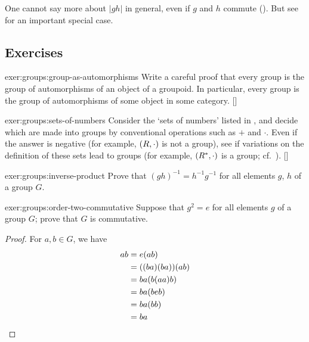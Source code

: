 One cannot say more about $|gh|$ in general, even if $g$ and $h$
commute (). But see
 for an important special
case.

\subsection*{Exercises}

\begin{exer}{\exerused}{exer:groups:group-as-automorphisms}
  Write a careful proof that every group is the group of automorphisms
  of an object of a groupoid. In particular, every group is the group of
  automorphisms of some object in some
  category. []
\end{exer}
\begin{exer}{\exerused}{exer:groups:sets-of-numbers}
  Consider the `sets of numbers' listed in
  , and decide which are
  made into groups by conventional operations such as $+$ and
  $\cdot$. Even if the answer is negative (for example, $(R, \cdot)$
  is not a group), see if variations on the definition of these sets
  lead to groups (for example, $(R^*, \cdot)$ is a group; cf.\
  ). []
\end{exer}
\begin{exer}{}{exer:groups:inverse-product}
  Prove that $(gh)^{-1} = h^{-1}g^{-1}$ for all elements $g$, $h$ of a
  group $G$.
\end{exer}
\begin{exer}{}{exer:groups:order-two-commutative}
  Suppose that $g^2 = e$ for all elements $g$ of a group $G$; prove
  that $G$ is commutative.
\end{exer}
\begin{proof}
  For $a,b \in G$, we have
  \begin{align*}
    a b 
    & = e (a b)\\
    & = ((b a) (b a)) (a b)\\
    & = b a (b (a a) b)\\
    & = b a (b e b)\\
    & = b a (b b)\\
    & = b a  \qedhere
  \end{align*}
\end{proof}

